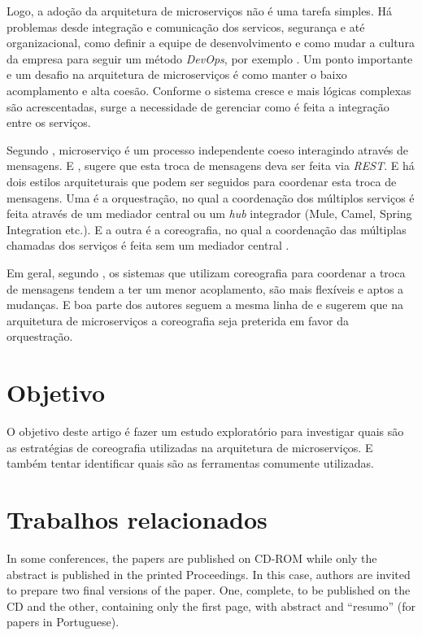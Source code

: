 \documentclass[12pt]{article}
\theoremstyle{plain}
\begin{document}
Logo, a adoção da arquitetura de microserviços não é uma tarefa simples. Há problemas desde integração e comunicação dos servicos, segurança e até organizacional, como definir a equipe de desenvolvimento e como mudar a cultura da empresa para seguir um método \textit{DevOps}, por exemplo \cite{jung:2017}. Um ponto importante e um desafio na arquitetura de microserviços é como manter o baixo acomplamento e alta coesão. Conforme o sistema cresce e mais lógicas complexas são acrescentadas, surge a necessidade de gerenciar como é feita a integração entre os serviços. 

Segundo \cite{Dragoni2017}, microserviço é um processo independente coeso interagindo através de mensagens. E \cite{Newman:15}, sugere que esta troca de mensagens deva ser feita via \textit{REST}. E há dois estilos arquiteturais que podem ser seguidos para coordenar esta troca de mensagens. Uma é a orquestração, no qual a coordenação dos múltiplos serviços é feita através de um mediador central ou um \textit{hub} integrador (Mule, Camel, Spring Integration etc.). E a outra é a coreografia, no qual a coordenação das múltiplas chamadas dos serviços é feita sem um mediador central \cite{richards:15, Newman:15}. 

Em geral, segundo \cite{Newman:15}, os sistemas que utilizam coreografia para coordenar a troca de mensagens tendem a ter um menor acoplamento, são mais flexíveis e aptos a mudanças. E boa parte dos autores \cite{wolf:2018, Dragoni2017, richards:15, Alshuqayran:2016} seguem a mesma linha de \cite{Newman:15} e sugerem que na arquitetura de microserviços a coreografia seja preterida em favor da orquestração.

\section{Objetivo} \label{sec:firstpage}

O objetivo deste artigo é fazer um estudo exploratório para investigar quais são as estratégias de coreografia utilizadas na arquitetura de microserviços. E também tentar identificar quais são as ferramentas comumente utilizadas. 

\section{Trabalhos relacionados}

In some conferences, the papers are published on CD-ROM while only the
abstract is published in the printed Proceedings. In this case, authors are
invited to prepare two final versions of the paper. One, complete, to be
published on the CD and the other, containing only the first page, with
abstract and ``resumo'' (for papers in Portuguese).
\end{document}
